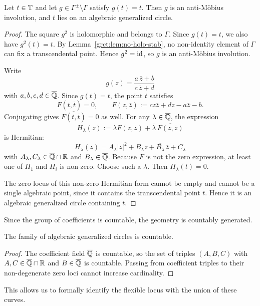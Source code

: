 \begin{lemma}\label{grct:lem:anti-fix}
	Let $t\in\mathbb{T}$ and let $g\in\Gamma^{\pm}\setminus\Gamma$ satisfy $g(t)=t$. Then $g$ is an anti-Möbius involution, and $t$ lies on an algebraic generalized circle.
\end{lemma}
\begin{proof}
	The square $g^2$ is holomorphic and belongs to $\Gamma$. Since $g(t)=t$, we also have $g^2(t)=t$. By Lemma~\ref{grct:lem:no-holo-stab}, no non-identity element of $\Gamma$ can fix a transcendental point. Hence $g^2=\mathrm{id}$, so $g$ is an anti-Möbius involution.
	
	Write
	\[
		g(z)=\frac{a\,\overline z+b}{c\,\overline z+d}
	\]
	with $a,b,c,d\in\overline{\mathbb{Q}}$. Since $g(t)=t$, the point $t$ satisfies
	\[
		F(t,\overline t)=0,\qquad
		F(z,\overline z):=cz\overline z+d z-a\overline z-b.
	\]
	Conjugating gives $\overline{F(t,\overline t)}=0$ as well. For any $\lambda\in\overline{\mathbb{Q}}$, the expression
	\[
		H_\lambda(z):=\lambda F(z,\overline z)+\overline{\lambda}\,\overline{F(z,\overline z)}
	\]
	is Hermitian:
	\[
		H_\lambda(z)
		=
		A_\lambda |z|^2+B_\lambda z+\overline{B_\lambda}\,\overline z+C_\lambda
	\]
	with $A_\lambda,C_\lambda\in\overline{\mathbb{Q}}\cap\mathbb{R}$ and $B_\lambda\in\overline{\mathbb{Q}}$. Because $F$ is not the zero expression, at least one of $H_1$ and $H_i$ is non-zero. Choose such a $\lambda$. Then $H_\lambda(t)=0$.
	
	The zero locus of this non-zero Hermitian form cannot be empty and cannot be a single algebraic point, since it contains the transcendental point $t$. Hence it is an algebraic generalized circle containing $t$.
\end{proof}

Since the group of coefficients is countable, the geometry is countably generated.

\begin{lemma}\label{grct:lem:countable-circles}
	The family of algebraic generalized circles is countable.
\end{lemma}
\begin{proof}
	The coefficient field $\overline{\mathbb{Q}}$ is countable, so the set of triples $(A,B,C)$ with $A,C\in\overline{\mathbb{Q}}\cap\mathbb{R}$ and $B\in\overline{\mathbb{Q}}$ is countable. Passing from coefficient triples to their non-degenerate zero loci cannot increase cardinality.
\end{proof}

This allows us to formally identify the flexible locus with the union of these curves.

